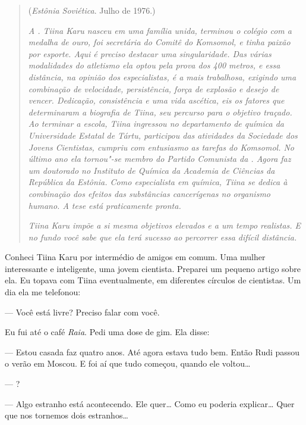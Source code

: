 \begin{quotation}
\begin{flushright}
(\emph{Estônia Soviética}. Julho de 1976.)
\end{flushright}
\vspace{4pt}
\noindent\emph{A . Tiina Karu nasceu em uma família unida,
terminou o colégio com a medalha de ouro, foi secretária do Comitê do
Komsomol, e tinha paixão por esporte. Aqui é preciso destacar uma
singularidade. Das várias modalidades do atletismo ela optou pela prova
dos 400 metros, e essa distância, na opinião dos especialistas, é a mais
trabalhosa, exigindo uma combinação de velocidade, persistência, força
de explosão e desejo de vencer. Dedicação, consistência e uma vida
ascética, eis os fatores que determinaram a biografia de Tiina, seu
percurso para o objetivo traçado. Ao terminar a escola, Tiina ingressou
no departamento de química da Universidade Estatal de Tártu, participou
das atividades da Sociedade dos Jovens Cientistas, cumpriu com
entusiasmo as tarefas do Komsomol. No último ano ela tornou"-se membro do
Partido Comunista da . Agora faz um doutorado no Instituto de
Química da Academia de Ciências da República da Estônia. Como
especialista em química, Tiina se dedica à combinação dos efeitos das
substâncias cancerígenas no organismo humano. A tese está praticamente
pronta.}

\emph{Tiina Karu impõe a si mesma objetivos elevados e a um tempo
realistas. E no fundo você sabe que ela terá sucesso ao percorrer essa
difícil distância.}
\end{quotation}

Conheci Tiina Karu por intermédio de amigos em comum. Uma mulher
interessante e inteligente, uma jovem cientista. Preparei um pequeno
artigo sobre ela. Eu topava com Tiina eventualmente, em diferentes
círculos de cientistas. Um dia ela me telefonou:

--- Você está livre? Preciso falar com você.

Eu fui até o café \emph{Raia}. Pedi uma dose de gim. Ela disse:

--- Estou casada faz quatro anos. Até agora estava tudo bem. Então Rudi
passou o verão em Moscou. E foi aí que tudo começou, quando ele
voltou\ldots{}

--- ?

--- Algo estranho está acontecendo. Ele quer\ldots{} Como eu poderia
explicar\ldots{} Quer que nos tornemos dois estranhos\ldots{}

